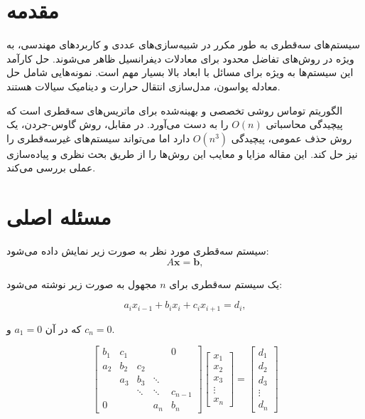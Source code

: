 \documentclass[a4paper,12pt]{article}
\begin{document}
\section*{مقدمه}
سیستم‌های سه‌قطری به طور مکرر در شبیه‌سازی‌های عددی و کاربردهای مهندسی، به ویژه در روش‌های تفاضل محدود برای معادلات دیفرانسیل ظاهر می‌شوند. حل کارآمد این سیستم‌ها به ویژه برای مسائل با ابعاد بالا بسیار مهم است. نمونه‌هایی شامل حل معادله پواسون، مدل‌سازی انتقال حرارت و دینامیک سیالات هستند.

الگوریتم توماس روشی تخصصی و بهینه‌شده برای ماتریس‌های سه‌قطری است که پیچیدگی محاسباتی \(O(n)\) را به دست می‌آورد. در مقابل، روش گاوس-جردن، یک روش حذف عمومی، پیچیدگی \(O(n^3)\) دارد اما می‌تواند سیستم‌های غیرسه‌قطری را نیز حل کند. این مقاله مزایا و معایب این روش‌ها را از طریق بحث نظری و پیاده‌سازی عملی بررسی می‌کند.

\newpage
\section*{مسئله اصلی}
سیستم سه‌قطری مورد نظر به صورت زیر نمایش داده می‌شود:
\[
A \mathbf{x} = \mathbf{b},
\]

یک سیستم سه‌قطری برای \( n \) مجهول به صورت زیر نوشته می‌شود:

\[
a_i x_{i-1} + b_i x_i + c_i x_{i+1} = d_i,
\]

که در آن \( a_1 = 0 \) و \( c_n = 0 \).

\[
\begin{bmatrix}
b_{1} & c_{1} & & & 0 \\
a_{2} & b_{2} & c_{2} & & \\
& a_{3} & b_{3} & \ddots & \\
& & \ddots & \ddots & c_{n-1} \\
0 & & & a_{n} & b_{n}
\end{bmatrix}
\begin{bmatrix}
x_{1} \\ x_{2} \\ x_{3} \\ \vdots \\ x_{n}
\end{bmatrix}
=
\begin{bmatrix}
d_{1} \\ d_{2} \\ d_{3} \\ \vdots \\ d_{n}
\end{bmatrix}
\]
\end{document}
